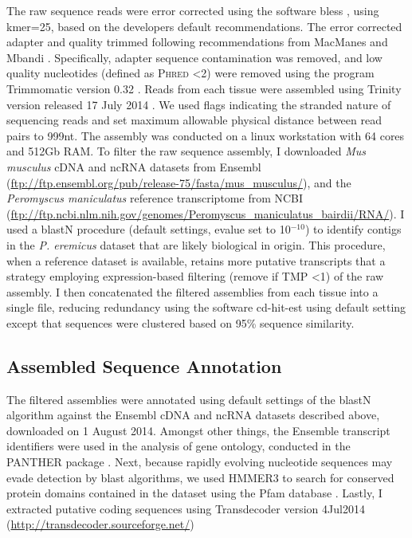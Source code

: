 \documentclass[11pt]{article}
\begin{document}
The raw sequence reads were error corrected using the software bless \cite{Heo:2014cb}, using kmer=25, based on the developers default recommendations. The error corrected adapter and quality trimmed following recommendations from MacManes \cite{MacManes:2014io} and Mbandi \cite{Christoffels:2014bg}. Specifically, adapter sequence contamination was removed, and low quality nucleotides (defined as \textsc{Phred} \textless 2) were removed using the program Trimmomatic version 0.32  \cite{Lohse:2012fg}. Reads from each tissue were assembled using Trinity version released 17 July 2014 \cite{Haas:2013jq}. We used flags indicating the stranded nature of sequencing reads and set maximum allowable physical distance between read pairs to 999nt. The assembly was conducted on a linux workstation with 64 cores and 512Gb RAM. To filter the raw sequence assembly, I downloaded \textit{Mus musculus} cDNA and ncRNA datasets from Ensembl (\url{ftp://ftp.ensembl.org/pub/release-75/fasta/mus_musculus/}), and the \textit{Peromyscus maniculatus} reference transcriptome from NCBI (\url{ftp://ftp.ncbi.nlm.nih.gov/genomes/Peromyscus_maniculatus_bairdii/RNA/}). I used a blastN procedure (default settings, evalue set to 10$^{-10}$) to identify contigs in the \textit{P. eremicus} dataset that are likely biological in origin. This procedure, when a reference dataset is available, retains more putative transcripts that a strategy employing expression-based filtering (remove if TMP \textless 1) of the raw assembly. I then concatenated the filtered assemblies from each tissue into a single file, reducing redundancy using the software cd-hit-est \cite{Li:2006hr} using default setting except that sequences were clustered based on 95\% sequence similarity. %

\subsection*{Assembled Sequence Annotation}



The filtered assemblies were annotated using default settings of the blastN algorithm \cite{Camacho:2009fc} against the Ensembl cDNA and ncRNA datasets described above, downloaded on 1 August 2014. Amongst other things, the Ensemble transcript identifiers were used in the analysis of gene ontology, conducted in the PANTHER package \cite{Mi:2004iv}. Next, because rapidly evolving nucleotide sequences may evade detection by blast algorithms, we used HMMER3 \cite{Wheeler:2013gj} to search for conserved protein domains contained in the dataset using the Pfam database \cite{Punta:2012ko}. Lastly, I extracted putative coding sequences using Transdecoder version 4Jul2014 (\url{http://transdecoder.sourceforge.net/})\\
\end{document}
